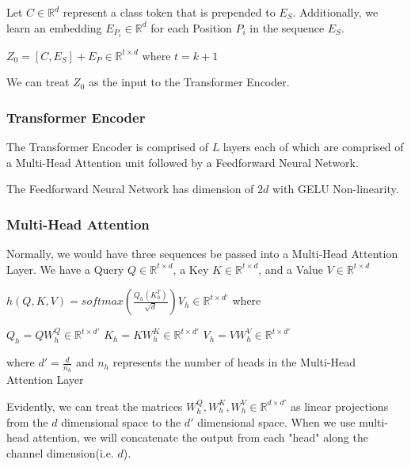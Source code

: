 \documentclass[11pt]{article}
\begin{document}
Let $C \in \mathbb{R}^{d}$ represent a class token that is prepended to $E_S$. Additionally, we learn an embedding $E_{P_i} \in \mathbb{R}^d$ for each Position $P_i$ in the sequence $E_S$. 


$Z_0 = [C, E_S] + E_P \in \mathbb{R}^{t \times d}$
where $t = k + 1$ \newline 

We can treat $Z_0$ as the input to the Transformer Encoder. 

\subsubsection{Transformer Encoder}
The Transformer Encoder is comprised of $L$ layers each of which are comprised of a Multi-Head Attention unit followed by a Feedforward Neural Network. \newline 

The Feedforward Neural Network has dimension of $2d$ with GELU Non-linearity. \newline 

\subsubsection{Multi-Head Attention}
Normally, we would have three sequences be passed into a Multi-Head Attention Layer. We have a Query $Q \in \mathbb{R}^{t \times d}$, a Key $K \in \mathbb{R}^{t \times d}$, and a Value $V \in \mathbb{R}^{t \times d}$ \newline 

$h(Q, K, V) = softmax(\frac{Q_h (K_h^T)}{\sqrt{d}}) V_h \in \mathbb{R}^{t \times d'}$ where \newline

$Q_h = QW_h^Q \in \mathbb{R}^{t \times d'}$ \newline 
$K_h = KW_h^K \in \mathbb{R}^{t \times d'}$ \newline 
$V_h = VW_h^V \in \mathbb{R}^{t \times d'}$ \newline 

where $d' = \frac{d}{n_h}$ and $n_h$ represents the number of heads in the Multi-Head Attention Layer \newline 

Evidently, we can treat the matrices $W_h^Q, W_h^K, W_h^V \in \mathbb{R}^{d \times d'}$ as linear projections from the $d$ dimensional space to the $d'$ dimensional space. When we use multi-head attention, we will concatenate the output from each "head" along the channel dimension(i.e. $d$). \newline 
\end{document}
